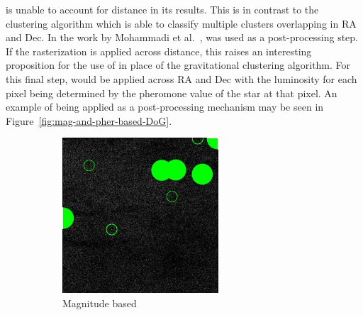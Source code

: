 \blobdog{} is unable to account for distance in its results. This is in contrast
to the clustering algorithm which is able to classify multiple clusters
overlapping in RA and Dec. In the work by Mohammadi et al.~\cite{Mohammadi},
\blobdog{} was used as a post-processing step. If the rasterization is applied
across distance, this raises an interesting proposition for the use of
\blobdog{} in place of the gravitational clustering algorithm. For this final
step, \blobdog{} would be applied across RA and Dec with the luminosity for each
pixel being determined by the pheromone value of the star at that pixel. An example of \blobdog{} being applied as a post-processing mechanism may be seen in Figure~\ref{fig:mag-and-pher-based-DoG}.
\begin{figure}[H]
    \centering
    \begin{subfigure}[b]{0.49\textwidth}
        \includegraphics[width=\textwidth, height=\textwidth]{./figures/blob-dog/a4-0.0-58.0-magnitude-based-blobs.jpg}
        \caption{Magnitude based}
        \label{fig:mag-based}
    \end{subfigure}
    \begin{subfigure}[b]{0.49\textwidth}

\end{subfigure}
\end{figure}
